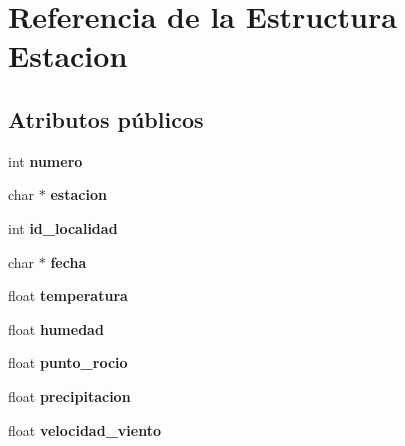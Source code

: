 \hypertarget{structEstacion}{}\section{Referencia de la Estructura Estacion}
\label{structEstacion}
\subsection*{Atributos públicos}
\begin{DoxyCompactItemize}
\item 
int {\bfseries numero}\hypertarget{structEstacion_a89ca6662dafea011e03137c5ce963c6c}{}\label{structEstacion_a89ca6662dafea011e03137c5ce963c6c}

\item 
char $\ast$ {\bfseries estacion}\hypertarget{structEstacion_ac8e2ad995d9b72caa83aa6426fae8e57}{}\label{structEstacion_ac8e2ad995d9b72caa83aa6426fae8e57}

\item 
int {\bfseries id\+\_\+localidad}\hypertarget{structEstacion_a08e119265b1373845ac65c12cdc47119}{}\label{structEstacion_a08e119265b1373845ac65c12cdc47119}

\item 
char $\ast$ {\bfseries fecha}\hypertarget{structEstacion_a766b05ad4185b8f17b0494b222c017f7}{}\label{structEstacion_a766b05ad4185b8f17b0494b222c017f7}

\item 
float {\bfseries temperatura}\hypertarget{structEstacion_ac2227df85b40a3dba2b33c641920e20d}{}\label{structEstacion_ac2227df85b40a3dba2b33c641920e20d}

\item 
float {\bfseries humedad}\hypertarget{structEstacion_a8eb3b12139e08500a5a630effad862dd}{}\label{structEstacion_a8eb3b12139e08500a5a630effad862dd}

\item 
float {\bfseries punto\+\_\+rocio}\hypertarget{structEstacion_a35a0f29478f360d02fa1a0777a677f89}{}\label{structEstacion_a35a0f29478f360d02fa1a0777a677f89}

\item 
float {\bfseries precipitacion}\hypertarget{structEstacion_ae40b75e661a67aa11f5b49d8eadda76d}{}\label{structEstacion_ae40b75e661a67aa11f5b49d8eadda76d}

\item 
float {\bfseries velocidad\+\_\+viento}\hypertarget{structEstacion_a70161c729f471290a2ba07aec23c8dcc}{}\label{structEstacion_a70161c729f471290a2ba07aec23c8dcc}


\end{DoxyCompactItemize}
